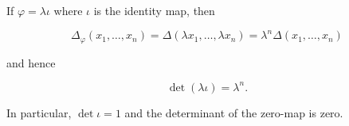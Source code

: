 If $\varphi = \lambda \iota$ where $\iota$ is the identity map, then

$$\Delta_\varphi(x_1, \ldots, x_n) = \Delta(\lambda x_1, \ldots, \lambda x_n) = \lambda^n \Delta(x_1, \ldots, x_n)$$

and hence

$$\det(\lambda \iota) = \lambda^n.$$

In particular, $\det \iota = 1$ and the determinant of the zero-map is zero.
